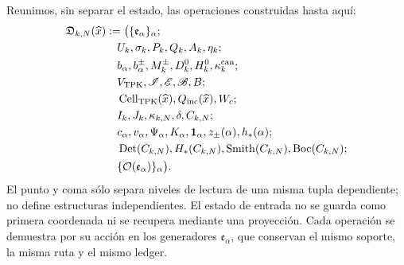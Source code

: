 Reunimos, sin separar el estado, las operaciones construidas hasta aquí:
\begin{equation}
\label{eq:pdfv2-cor-constructor-unico}
 \begin{aligned}
 \mathfrak D_{k,N}(\widehat x)
 &:=\bigl(\{\mathfrak e_\alpha\}_\alpha;\\
 &\quad U_k,\sigma_k,P_k,Q_k,A_k,\eta_k;\\
 &\quad b_\alpha,b_\alpha^\pm,M_k^\pm,D_k^0,H_k^0,
 \kappa_k^{\rm can};\\
 &\quad V_{\rm TPK},\mathscr I,\mathscr E,\mathscr B,B;\\
 &\quad \operatorname{Cell}_{\rm TPK}(\widehat x),Q_{\rm inc}(\widehat x),W_c;\\
 &\quad I_k,J_k,\kappa_{k,N},\delta,C_{k,N};\\
 &\quad c_\alpha,v_\alpha,\Psi_\alpha,K_\alpha,
 \mathbf1_\alpha,z_\pm(\alpha),h_*(\alpha);\\
 &\quad
 \operatorname{Det}(C_{k,N}),H_*(C_{k,N}),
 \operatorname{Smith}(C_{k,N}),\operatorname{Boc}(C_{k,N});\\
 &\quad \{\mathcal O(\mathfrak e_\alpha)\}_\alpha
 \bigr).
 \end{aligned}
\end{equation}
El punto y coma sólo separa niveles de lectura de una misma tupla dependiente;
no define estructuras independientes. El estado de entrada no se guarda como
primera coordenada ni se recupera mediante una proyección. Cada operación se
demuestra por su acción en los generadores \(\mathfrak e_\alpha\), que
conservan el mismo soporte, la misma ruta y el mismo ledger.

